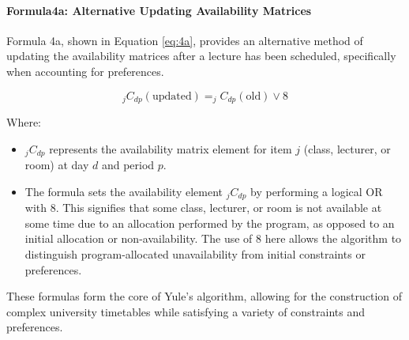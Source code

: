 \paragraph{Formula4a: Alternative Updating Availability Matrices}
Formula 4a, shown in Equation \ref{eq:4a}, provides an alternative method of updating the availability matrices after a lecture has been scheduled, specifically when accounting for preferences.

\begin{equation}
\label{eq:4a}
_jC_{dp} (\text{updated}) = _jC_{dp} (\text{old}) \vee 8
\end{equation}

Where:
\begin{itemize}
    \item \( _jC_{dp} \) represents the availability matrix element for item \( j \) (class, lecturer, or room) at day \( d \) and period \( p \).
    \item The formula sets the availability element \( _jC_{dp} \) by performing a logical OR with 8.
This signifies that some class, lecturer, or room is not available at some time due to an allocation performed by the program, as opposed to an initial allocation or non-availability.
The use of 8 here allows the algorithm to distinguish program-allocated unavailability from initial constraints or preferences.
\end{itemize}

These formulas form the core of Yule's algorithm, allowing for the construction of complex university timetables while satisfying a variety of constraints and preferences.
